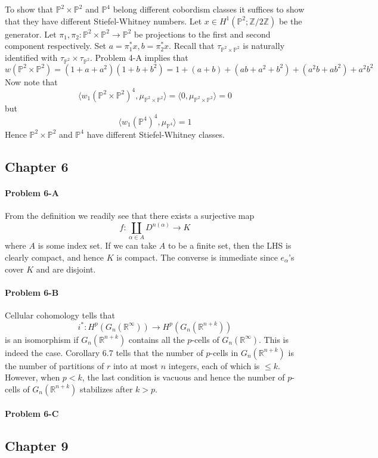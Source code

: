 \documentclass[12pt]{article}
\theoremstyle{plain}
\theoremstyle{definition}
\newcommand{\IP}{\mathbb{P}}
\newcommand{\IR}{\mathbb{R}}
\newcommand{\IZ}{\mathbb{Z}}
\newcommand{\<}{\langle}
\renewcommand{\>}{\rangle}
\begin{document}
To show that $\IP^2 \times \IP^2$ and $\IP^4$ belong different cobordism classes it suffices to show that they have different Stiefel-Whitney numbers. Let $x \in H^1(\IP^2; \IZ/2\IZ)$ be the generator. Let $\pi_1, \pi_2 : \IP^2 \times \IP^2 \to \IP^2$ be projections to the first and second component respectively. Set $a = \pi_1^* x, b = \pi_2^* x$. Recall that $\tau_{\IP^2 \times \IP^2}$ is naturally identified with $\tau_{\IP^2} \times \tau_{\IP^2}
$. Problem 4-A implies that 
$$ w(\IP^2 \times \IP^2) = (1 + a + a^2)(1 + b + b^2) = 1 + (a + b) + (ab + a^2 + b^2 ) + (a^2 b + a b^2) + a^2 b^2$$
Now note that 
$$ \< w_1(\IP^2 \times \IP^2)^4, \mu_{\IP^2 \times \IP^2} \> = \< 0, \mu_{\IP^2 \times \IP^2} \> = 0$$
but 
$$ \< w_1(\IP^4)^4, \mu_{\IP^4} \> = 1 $$
Hence $\IP^2 \times \IP^2$ and $\IP^4$ have different Stiefel-Whitney classes. 


\subsection*{Chapter 6}
\paragraph{Problem 6-A}
From the definition we readily see that there exists a surjective map 
$$ f : \coprod_{\alpha \in A} D^{n(\alpha)} \to K $$ where $A$ is some index set. If we can take $A$ to be a finite set, then the LHS is clearly compact, and hence $K$ is compact. The converse is immediate since $e_\alpha$'s cover $K$ and are disjoint. 

\paragraph{Problem 6-B}
Cellular cohomology tells that $$ i^* : H^p(G_n(\IR^\infty)) \to H^p(G_n(\IR^{n + k})) $$
is an isomorphism if $G_n(\IR^{n + k})$  contains all the $p$-cells of $G_n(\IR^\infty)$. This is indeed the case. Corollary 6.7 tells that the number of $p$-cells in $G_n(\IR^{n + k})$ is the number of partitions of $r$ into at most $n$ integers, each of which is $\le k$. However, when $p < k$, the last condition is vacuous and hence the number of $p$-cells of $G_n(\IR^{n + k})$ stabilizes after $k > p$. 

\paragraph{Problem 6-C}


\subsection*{Chapter 9}
\end{document}
